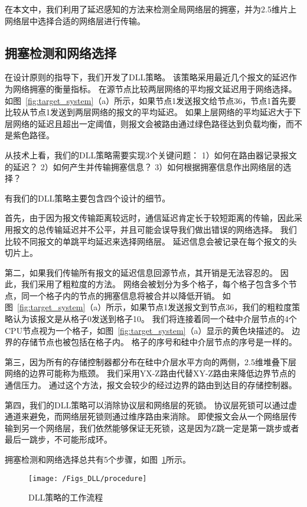 在本文中，我们利用了延迟感知的方法来检测全局网络层的拥塞，并为2.5维片上网络层中选择合适的网络层进行传输。

\subsection{拥塞检测和网络选择}

在设计原则的指导下，我们开发了DLL策略。
该策略采用最近几个报文的延迟作为网络拥塞的衡量指标。
在源节点比较两层网络的平均报文延迟用于网络选择。
如图~\ref{fig:target_system}（a）所示，如果节点1发送报文给节点36，节点1首先要比较从节点1发送到两层网络的报文的平均延迟。
如果上层网络的平均延迟大于下层网络的延迟且超出一定阈值，则报文会被路由通过绿色路径达到负载均衡，而不是紫色路径。

从技术上看，我们的DLL策略需要实现3个关键问题：
1）如何在路由器记录报文的延迟？
2）如何产生并传输拥塞信息？
3）如何根据拥塞信息作出网络层的选择？

有我们的DLL策略主要包含四个设计的细节。

首先，由于因为报文传输距离较远时，通信延迟肯定长于较短距离的传输，因此采用报文的总传输延迟并不公平，并且可能会误导我们做出错误的网络选择。
我们比较不同报文的单跳平均延迟来选择网络层。
延迟信息会被记录在每个报文的头切片上。

第二，如果我们传输所有报文的延迟信息回源节点，其开销是无法容忍的。
因此，我们采用了粗粒度的方法。
网络会被划分为多个格子，每个格子包含多个节点，同一个格子内的节点的拥塞信息将被合并以降低开销。
如图~\ref{fig:target_system}（a）所示，如果节点1发送报文到节点36，我们的粗粒度策略认为该报文是从格子0发送到格子10。
我们将连接着同一个硅中介层节点的4个CPU节点视为一个格子，如图~\ref{fig:target_system}（a）显示的黄色块描述的。
边界的存储节点也被包括在格子内。
格子的序号和硅中介层节点的序号是一样的。

第三，因为所有的存储控制器都分布在硅中介层水平方向的两侧，2.5维堆叠下层网络的边界可能称为瓶颈。
我们采用YX-Z路由代替XY-Z路由来降低边界节点的通信压力。
通过这个方法，报文会较少的经过边界的路由到达目的存储控制器。

第四，我们的DLL策略可以消除协议层和网络层的死锁。
协议层死锁可以通过虚通道来避免，而网络层死锁则通过维序路由来消除。
即使报文会从一个网络层传输到另一个网络层，我们依然能够保证无死锁，这是因为Z跳一定是第一跳步或者最后一跳步，不可能形成环。

拥塞检测和网络选择总共有5个步骤，如图~\ref{fig:procedure}所示。

\begin{figure}[htbp] %
  \centering
  \texttt{[image: /Figs\_DLL/procedure]}
  \caption{DLL策略的工作流程}
  \label{fig:procedure}
\end{figure}

